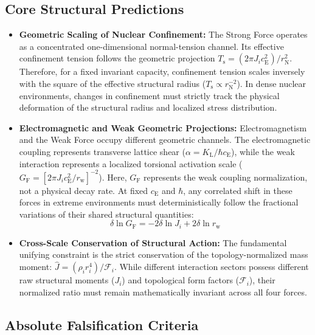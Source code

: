\subsection*{Core Structural Predictions}

\begin{itemize}
    \item \textbf{Geometric Scaling of Nuclear Confinement:} The Strong Force operates as a concentrated one-dimensional normal-tension channel. Its effective confinement tension follows the geometric projection $T_{\mathrm{s}} = (2\pi J_i c_{\mathrm E}^{2}) / r_{\mathrm N}^{2}$. Therefore, for a fixed invariant capacity, confinement tension scales inversely with the square of the effective structural radius ($T_{\mathrm{s}} \propto r_{\mathrm N}^{-2}$). In dense nuclear environments, changes in confinement must strictly track the physical deformation of the structural radius and localized stress distribution.

    \item \textbf{Electromagnetic and Weak Geometric Projections:} Electromagnetism and the Weak Force occupy different geometric channels. The electromagnetic coupling represents transverse lattice shear ($\alpha = K_{\mathrm L} / \hbar c_{\mathrm E}$), while the weak interaction represents a localized torsional activation scale ($G_{\mathrm F} = [2\pi J_i c_{\mathrm E}^{2} / r_{\mathrm w}]^{-2}$). Here, $G_{\mathrm F}$ represents the weak coupling normalization, not a physical decay rate. At fixed $c_{\mathrm E}$ and $\hbar$, any correlated shift in these forces in extreme environments must deterministically follow the fractional variations of their shared structural quantities:
    \begin{equation}
        \delta\ln G_{\mathrm F} = -2\delta\ln J_i + 2\delta\ln r_{\mathrm w}
    \end{equation}

    \item \textbf{Cross-Scale Conservation of Structural Action:} The fundamental unifying constraint is the strict conservation of the topology-normalized mass moment: $\hat{J} = (\rho_i r_i^{4}) / \mathcal{F}_i$. While different interaction sectors possess different raw structural moments ($J_i$) and topological form factors ($\mathcal{F}_i$), their normalized ratio must remain mathematically invariant across all four forces.
\end{itemize}

\subsection*{Absolute Falsification Criteria}

